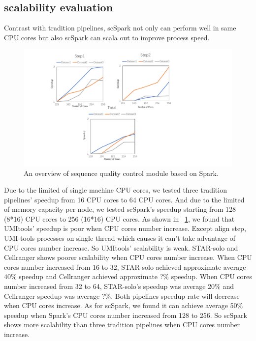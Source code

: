 \documentclass[conference]{IEEEtran}
\begin{document}
\subsection{scalability evaluation} 
Contrast with tradition pipelines, scSpark not only can perform well in same CPU cores but also scSpark can scala out to improve process speed.
\begin{figure}
	\includegraphics[width=\textwidth]{Fig5.pdf}
	\caption{An overview of sequence quality control module based on Spark.} \label{fig5}
\end{figure}
Due to the limited of single machine CPU cores, we tested three tradition pipelines' speedup from 16 CPU cores to 64 CPU cores.
And due to the limited of memory capacity per node, we tested scSpark's speedup starting from 128 (8*16) CPU cores to 256 (16*16) CPU cores.
As shown in ~\ref{fig5}, we found that UMI\-tools' speedup is poor when CPU cores number increase.
Except align step, UMI-tools processes on single thread which causes it can't take advantage of CPU cores number increase.
So UMI\-tools' scalability is weak.
STAR-solo and Cellranger shows poorer scalability when CPU cores number increase.
When CPU cores number increased from 16 to 32, STAR-solo achieved approximate average 40\% speedup and Cellranger achieved approximate ?\% speedup.
When CPU cores number increased from 32 to 64, STAR-solo's speedup was average 20\% and Cellranger speedup was average ?\%.
Both pipelines speedup rate will decrease when CPU cores increase.
As for scSpark, we found it can achieve average 50\% speedup when Spark's CPU cores number increased from 128 to 256.
So scSpark shows more scalability than three tradition pipelines when CPU cores number increase.
\end{document}
